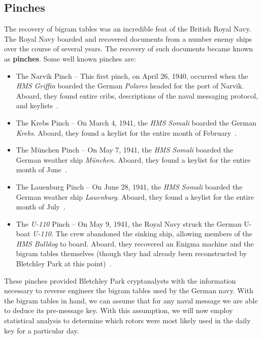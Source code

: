 \subsection{Pinches}
The recovery of bigram tables was an incredible feat of the British
Royal Navy. The Royal Navy boarded and recovered documents from a
number enemy ships over the course of several years. The recovery of
such documents became known as {\bf{pinches}}. Some well known pinches are:
\begin{itemize}
  \item The Narvik Pinch -- This first pinch, on April 26, 1940,
    occurred when the \emph{HMS Griffin} boarded the German
    \emph{Polares} headed for the port of Narvik. Aboard, they found
    entire cribs, descriptions of the naval messaging protocol, and keylists~\cite[p.~259]{action_this_day}.
  \item The Krebs Pinch -- On March 4, 1941, the \emph{HMS Somali}
    boarded the German \emph{Krebs}. Aboard, they found a keylist for
    the entire month of February~\cite[p.~260]{action_this_day}.
  \item The München Pinch -- On May 7, 1941, the \emph{HMS Somali}
    boarded the German weather ship \emph{München}. Aboard, they
    found a keylist for the entire month of June~\cite[p.~260]{action_this_day}.
  \item The Lauenburg Pinch -- On June 28, 1941, the \emph{HMS
    Somali} boarded the German weather ship \emph{Lauenburg}. Aboard,
    they found a keylist for the entire month of July~\cite[260]{action_this_day}.
  \item The \emph{U-110} Pinch -- On May 9, 1941, the Royal Navy
    struck the German U-boat \emph{U-110}. The crew abandoned the
    sinking ship, allowing members of the \emph{HMS Bulldog} to
    board. Aboard, they recovered an Enigma machine and the bigram
    tables themselves (though they had already been reconstructed by
    Bletchley Park at this point)~\cite[p.~261]{action_this_day}.
\end{itemize}
\noindent These pinches provided Bletchley Park cryptanalysts with
the information necessary to reverse engineer the bigram tables used
by the German navy. With the bigram tables in hand, we can assume that for any
naval message we are able to deduce its pre-message key. With this
assumption, we will now employ statistical analysis to determine
which rotors were most likely used in the daily key for a particular day.

